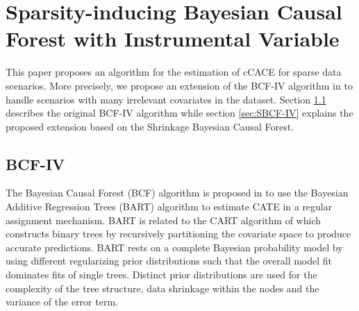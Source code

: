 \chapter{Sparsity-inducing Bayesian Causal Forest with
Instrumental Variable}

This paper proposes an algorithm for the estimation of cCACE for sparse data scenarios. 
More precisely, we propose an extension of the BCF-IV algorithm in \cite{bargagli-stoffi_heterogeneous_2022} 
to handle scenarios with many irrelevant covariates in the dataset.
Section \ref{sec:BCF-IV} describes the original BCF-IV algorithm while section
\ref{sec:SBCF-IV} explains the proposed extension based on the Shrinkage Bayesian Causal Forest. 


\section{BCF-IV}
\label{sec:BCF-IV}

The Bayesian Causal Forest (BCF) algorithm is proposed in \cite{hahn_bayesian_2020} to use the Bayesian Additive Regression Trees (BART) algorithm \cite{chipman_bart_2010} to estimate CATE in a regular assignment mechanism. BART is related to the CART algorithm of \cite{Breiman1984} which constructs binary trees by recursively partitioning the covariate space to produce accurate predictions.
BART rests on a complete Bayesian probability model by using different regularizing prior distributions such that the overall model fit dominates fits of single trees. Distinct prior distributions are used for the complexity of the tree structure, data shrinkage within the nodes and the variance of the error term. 


